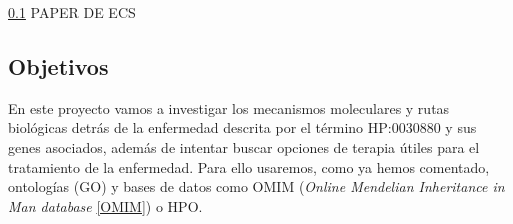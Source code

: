\ref{} PAPER DE ECS

\subsection{Objetivos}

En este proyecto vamos a investigar los mecanismos moleculares y rutas biológicas detrás de la enfermedad descrita por el término HP:0030880 y sus genes asociados, además de intentar buscar opciones de terapia útiles para el tratamiento de la enfermedad. Para ello usaremos, como ya hemos comentado, ontologías (GO) y bases de datos como OMIM (\textit{Online Mendelian Inheritance in Man database} \ref{OMIM}) o HPO.

